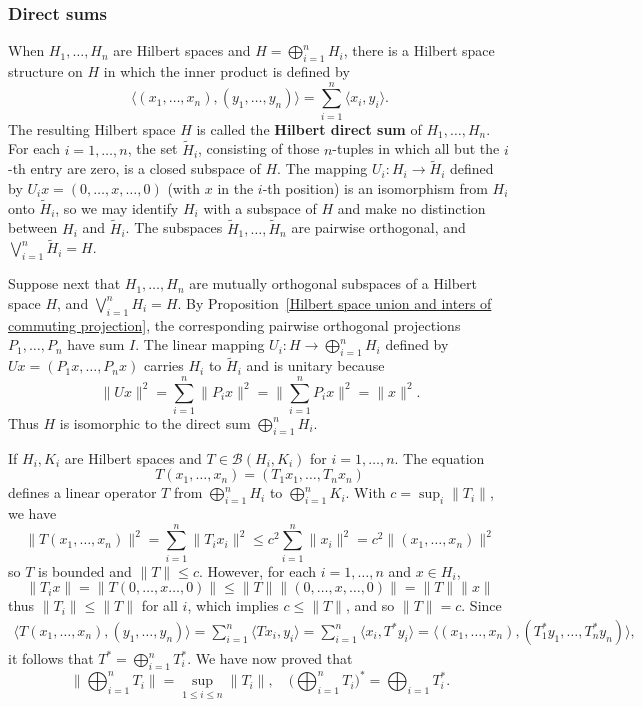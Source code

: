 \subsubsection{Direct sums}
When $H_1,\dots,H_n$ are Hilbert spaces and $H=\bigoplus_{i=1}^{n}H_i$, there is a Hilbert space structure on $H$ in which the inner product is defined by
\[\langle(x_1,\dots,x_n),(y_1,\dots,y_n)\rangle=\sum_{i=1}^{n}\langle x_i,y_i\rangle.\]
The resulting Hilbert space $H$ is called the \textbf{Hilbert direct sum} of $H_1,\dots,H_n$. For each $i=1,\dots,n$, the set $\widetilde{H}_i$, consisting of those $n$-tuples in which all but the $i$-th entry are zero, is a closed subspace of $H$. The mapping $U_i:H_i\to\widetilde{H}_i$ defined by $U_ix=(0,\dots,x,\dots,0)$ (with $x$ in the $i$-th position) is an isomorphism from $H_i$ onto $\widetilde{H}_i$, so we may identify $H_i$ with a subspace of $H$ and make no distinction between $H_i$ and $\widetilde{H}_i$. The subspaces $\widetilde{H}_1,\dots,\widetilde{H}_n$ are pairwise orthogonal, and $\bigvee_{i=1}^{n}\widetilde{H}_i=H$.\par
Suppose next that $H_1,\dots,H_n$ are mutually orthogonal subspaces of a Hilbert space $H$, and $\bigvee_{i=1}^{n}H_i=H$. By Proposition~\ref{Hilbert space union and inters of commuting projection}, the corresponding pairwise orthogonal projections $P_1,\dots,P_n$ have sum $I$. The linear mapping $U_i:H\to\bigoplus_{i=1}^{n}H_i$ defined by $Ux=(P_1x,\dots,P_nx)$ carries $H_i$ to $\widetilde{H}_i$ and is unitary because
\[\|Ux\|^2=\sum_{i=1}^{n}\|P_ix\|^2=\|\sum_{i=1}^{n}P_ix\|^2=\|x\|^2.\]
Thus $H$ is isomorphic to the direct sum $\bigoplus_{i=1}^{n}H_i$.\par
If $H_i,K_i$ are Hilbert spaces and $T\in\mathcal{B}(H_i,K_i)$ for $i=1,\dots,n$. The equation
\[T(x_1,\dots,x_n)=(T_1x_1,\dots,T_nx_n)\]
defines a linear operator $T$ from $\bigoplus_{i=1}^{n}H_i$ to $\bigoplus_{i=1}^{n}K_i$. With $c=\sup_{i}\|T_i\|$, we have
\[\|T(x_1,\dots,x_n)\|^2=\sum_{i=1}^{n}\|T_ix_i\|^2\leq c^2\sum_{i=1}^{n}\|x_i\|^2=c^2\|(x_1,\dots,x_n)\|^2\]
so $T$ is bounded and $\|T\|\leq c$. However, for each $i=1,\dots,n$ and $x\in H_i$,
\[\|T_ix\|=\|T(0,\dots,x\dots,0)\|\leq\|T\|\|(0,\dots,x,\dots,0)\|=\|T\|\|x\|\]
thus $\|T_i\|\leq\|T\|$ for all $i$, which implies $c\leq \|T\|$, and so $\|T\|=c$. Since
\begin{align*}
\langle T(x_1,\dots,x_n),(y_1,\dots,y_n)\rangle=\sum_{i=1}^{n}\langle Tx_i,y_i\rangle=\sum_{i=1}^{n}\langle x_i,T^*y_i\rangle=\langle(x_1,\dots,x_n),(T_1^*y_1,\dots,T_n^*y_n)\rangle,
\end{align*}
it follows that $T^*=\bigoplus_{i=1}^{n}T_i^*$. We have now proved that
\[\|\bigoplus_{i=1}^{n}T_i\|=\sup_{1\leq i\leq n}\|T_i\|,\quad \Big(\bigoplus_{i=1}^{n}T_i\Big)^*=\bigoplus_{i=1}T_i^*.\]

